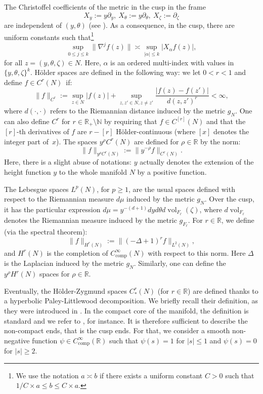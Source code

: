 \documentclass[10pt]{amsart}
\newcommand{\R}{\mathbb{R}}
\newcommand{\N}{\mathbb{N}}
\DeclareMathOperator{\vol}{\mathrm{vol}}
\theoremstyle{plain}
\theoremstyle{definition}
\begin{document}
The Christoffel coefficients of the metric in the cusp in the frame
\[
X_y := y\partial_y,\ X_\theta:= y\partial_\theta,\ X_\zeta:= \partial_\zeta
\]
are independent of $(y,\theta)$ (see \cite[App.\,A.3.2]{Bonthonneau-15}). As a consequence, in the cusp, there are uniform constants such that\footnote{We use the notation $a \asymp b$ if there exists a uniform constant $C > 0$ such that $1/C \times a \leq b \leq C \times a$.}
\begin{equation}\label{eq:equivalent-local-Ck-norm}
\sup_{0 \leq j \leq k} \|\nabla^j f(z)\| \asymp\sup_{|\alpha| \leq k} |X_\alpha f(z)|,
\end{equation}
for all $z=(y,\theta,\zeta) \in N$. Here, $\alpha$ is an ordered multi-index with values in $\{y,\theta,\zeta\}^k$. Hölder spaces are defined in the following way: we let $0 \!<\! r\! <\! 1$ and define $f \!\in\! C^r(N)$~if:
\[
\|f\|_{C^r} := \sup_{z \in N} |f(z)| + \sup_{z,z' \in N, z \neq z'} \frac{|f(z)-f(z')|}{d(z,z')^r} < \infty,
\]
where $d(\cdot,\cdot)$ refers to the Riemannian distance induced by the metric $g_N$. One can also define $C^r$ for $r \in \R_+ \setminus \N$ by requiring that $f \in C^{[r]}(N)$ and that the $[r]$-th derivatives of $f$ are $r-[r]$ Hölder-continuous (where $[x]$ denotes the integer part of~$x$). The spaces $y^\rho C^r(N)$ are defined for $\rho \in \R$ by the norm:
\[
\|f\|_{y^\rho C^r(N)} := \|y^{-\rho}f\|_{C^r(N)}.
\]
Here, there is a slight abuse of notations: $y$ actually denotes the extension of the height function $y$ to the whole manifold $N$ by a positive function.

The Lebesgue spaces $L^p(N)$, for $p \geq 1$, are the usual spaces defined with respect to the Riemannian measure $d\mu$ induced by the metric $g_N$. Over the cusp, it has the particular expression $d\mu = y^{-(d+1)} dy d\theta d\vol_{F_\ell}(\zeta)$, where $d\vol_{F_\ell}$ denotes the Riemannian measure induced by the metric $g_{F_\ell}$. For $r \in \R$, we define (via the spectral theorem):
\begin{equation}
\label{equation:norm-sobolev}
\|f\|_{H^r(N)}:= \|(-\Delta+1)^rf\|_{L^2(N)},
\end{equation}
and $H^r(N)$ is the completion of $C_{\mathrm{comp}}^\infty(N)$ with respect to this norm. Here $\Delta$ is the Laplacian induced by the metric $g_N$. Similarly, one can define the $y^\rho H^r(N)$ spaces for $\rho \in \R$.

Eventually, the Hölder-Zygmund spaces $C^r_\ast(N)$ (for $r \in \R$) are defined thanks to a hyperbolic Paley-Littlewood decomposition. We briefly recall their definition, as they were introduced in \cite{Bonthonneau-Lefeuvre-19-1}. In the compact core of the manifold, the definition is standard and we refer to \cite{Taylor-III-96edition}, for instance. It is therefore sufficient to describe the non-compact ends, that is the cusp ends. For that, we consider a smooth non-negative function $\psi \in C^\infty_{\mathrm{comp}}(\R)$ such that $\psi(s) = 1$ for $|s| \leq 1$ and $\psi(s) = 0$ for $|s| \geq 2$.
\end{document}
